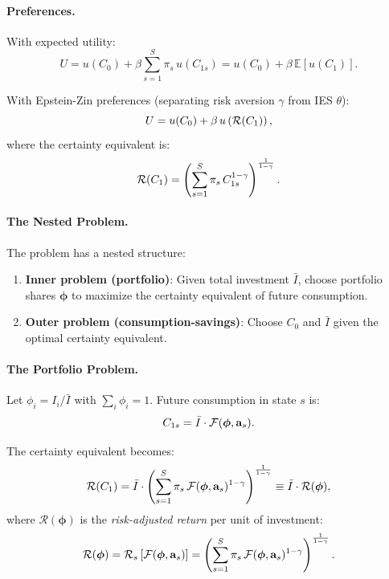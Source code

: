\paragraph{Preferences.}
With expected utility:
\begin{equation}
U = u(C_0) + \beta \sum_{s=1}^{S} \pi_s \, u(C_{1s}) = u(C_0) + \beta \, \mathbb{E}[u(C_1)].
\label{eq:ac-risk-EU}
\end{equation}

With Epstein-Zin preferences (separating risk aversion $\gamma$ from IES $\theta$):
\begin{equation}
U = u(C_0) + \beta \, u\left( \mathcal{R}(C_1) \right),
\label{eq:ac-risk-EZ}
\end{equation}
where the certainty equivalent is:
\begin{equation}
\mathcal{R}(C_1) = \left( \sum_{s=1}^{S} \pi_s \, C_{1s}^{1-\gamma} \right)^{\frac{1}{1-\gamma}}.
\label{eq:ac-risk-CE}
\end{equation}

\paragraph{The Nested Problem.}
The problem has a nested structure:
\begin{enumerate}[nosep]
\item \textbf{Inner problem (portfolio)}: Given total investment $\bar{I}$, choose portfolio shares $\boldsymbol{\phi}$ to maximize the certainty equivalent of future consumption.
\item \textbf{Outer problem (consumption-savings)}: Choose $C_0$ and $\bar{I}$ given the optimal certainty equivalent.
\end{enumerate}

\paragraph{The Portfolio Problem.}
Let $\phi_i = I_i / \bar{I}$ with $\sum_i \phi_i = 1$. Future consumption in state $s$ is:
\begin{equation}
C_{1s} = \bar{I} \cdot \mathcal{F}(\boldsymbol{\phi}, \mathbf{a}_s).
\label{eq:ac-risk-C1s-phi}
\end{equation}

The certainty equivalent becomes:
\begin{equation}
\mathcal{R}(C_1) = \bar{I} \cdot \left( \sum_{s=1}^{S} \pi_s \, \mathcal{F}(\boldsymbol{\phi}, \mathbf{a}_s)^{1-\gamma} \right)^{\frac{1}{1-\gamma}} \equiv \bar{I} \cdot \mathcal{R}(\boldsymbol{\phi}),
\label{eq:ac-risk-CE-phi}
\end{equation}
where $\mathcal{R}(\boldsymbol{\phi})$ is the \emph{risk-adjusted return} per unit of investment:
\begin{equation}
\mathcal{R}(\boldsymbol{\phi}) = \mathcal{R}_s\left[ \mathcal{F}(\boldsymbol{\phi}, \mathbf{a}_s) \right] = \left( \sum_{s=1}^{S} \pi_s \, \mathcal{F}(\boldsymbol{\phi}, \mathbf{a}_s)^{1-\gamma} \right)^{\frac{1}{1-\gamma}}.
\label{eq:ac-risk-R-phi}
\end{equation}

